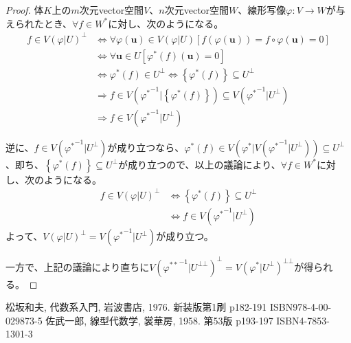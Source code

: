 \documentclass[dvipdfmx]{jsarticle}
\begin{document}
\begin{proof}
体$K$上の$m$次元vector空間$V$、$n$次元vector空間$W$、線形写像$\varphi:V \rightarrow W$が与えられたとき、$\forall f \in W^{*}$に対し、次のようになる。
\begin{align*}
f \in {V\left( \varphi|U \right)}^{\bot} &\Leftrightarrow \forall\varphi\left( \mathbf{u} \right) \in V\left( \varphi|U \right)\left[ f\left( \varphi\left( \mathbf{u} \right) \right) = f \circ \varphi\left( \mathbf{u} \right) = 0 \right]\\
&\Leftrightarrow \forall\mathbf{u} \in U\left[ \varphi^{*}(f)\left( \mathbf{u} \right) = 0 \right]\\
&\Leftrightarrow \varphi^{*}(f) \in U^{\bot} \Leftrightarrow \left\{ \varphi^{*}(f) \right\} \subseteq U^{\bot}\\
&\Rightarrow f \in V\left( {\varphi^{*}}^{- 1}|\left\{ \varphi^{*}(f) \right\} \right) \subseteq V\left( {\varphi^{*}}^{- 1}|U^{\bot} \right)\\
&\Rightarrow f \in V\left( {\varphi^{*}}^{- 1}|U^{\bot} \right)
\end{align*}\par
逆に、$f \in V\left( {\varphi^{*}}^{- 1}|U^{\bot} \right)$が成り立つなら、$\varphi^{*}(f) \in V\left( \varphi^{*}|V\left( {\varphi^{*}}^{- 1}|U^{\bot} \right) \right) \subseteq U^{\bot}$、即ち、$\left\{ \varphi^{*}(f) \right\} \subseteq U^{\bot}$が成り立つので、以上の議論により、$\forall f \in W^{*}$に対し、次のようになる。
\begin{align*}
f \in {V\left( \varphi|U \right)}^{\bot} &\Leftrightarrow \left\{ \varphi^{*}(f) \right\} \subseteq U^{\bot}\\
&\Leftrightarrow f \in V\left( {\varphi^{*}}^{- 1}|U^{\bot} \right)
\end{align*}
よって、${V\left( \varphi|U \right)}^{\bot} = V\left( {\varphi^{*}}^{- 1}|U^{\bot} \right)$が成り立つ。\par
一方で、上記の議論により直ちに${V\left( {\varphi^{**}}^{- 1}|U^{\bot\bot} \right)}^{\bot} = V\left( \varphi^{*}|U^{\bot} \right)^{\bot\bot}$が得られる。
\end{proof}
\begin{thebibliography}{50}
  松坂和夫, 代数系入門, 岩波書店, 1976. 新装版第1刷 p182-191 ISBN978-4-00-029873-5
  佐武一郎, 線型代数学, 裳華房, 1958. 第53版 p193-197 ISBN4-7853-1301-3
\end{thebibliography}
\end{document}
